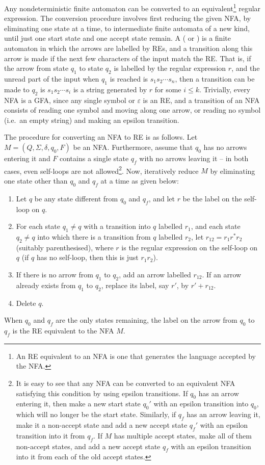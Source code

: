 Any nondeterministic finite automaton can be converted to an equivalent\footnote{An RE equivalent to an NFA is one that generates the language accepted by the NFA.} regular expression. The conversion procedure involves first reducing the given NFA, by eliminating one state at a time, to intermediate finite automata of a new kind, until just one start state and one accept state remain. A  ( or ) is a finite automaton in which the arrows are labelled by REs, and a transition along this arrow is made if the next few characters of the input match the RE. That is, if the arrow from state $q_1$ to state $q_2$ is labelled by the regular expression $r$, and the unread part of the input when $q_1$ is reached is $s_1 s_2 \cdots s_n$, then a transition can be made to $q_2$ is $s_1 s_2 \cdots s_i$ is a string generated by $r$ for some $i \le k$. Trivially, every NFA is a GFA, since any single symbol or $\varepsilon$ is an RE, and a transition of an NFA consists of reading one symbol and moving along one arrow, or reading no symbol (i.e.\ an empty string) and making an epsilon transition.

The procedure for converting an NFA to RE is as follows. Let $M = (Q, \Sigma, \delta, q_0, F)$ be an NFA. Furthermore, assume that $q_0$ has no arrows entering it and $F$ contains a single state $q_f$ with no arrows leaving it -- in both cases, even self-loops are not allowed\footnote{It is easy to see that any NFA can be converted to an equivalent NFA satisfying this condition by using epsilon transitions. If $q_0$ has an arrow entering it, then make a new start state $q_0'$ with an epsilon transition into $q_0$, which will no longer be the start state. Similarly, if $q_f$ has an arrow leaving it, make it a non-accept state and add a new accept state $q_f'$ with an epsilon transition into it from $q_f$. If $M$ has multiple accept states, make all of them non-accept states, and add a new accept state $q_f$ with an epsilon transition into it from each of the old accept states.}. Now, iteratively reduce $M$ by eliminating one state other than $q_0$ and $q_f$ at a time as given below:
\begin{enumerate}
\item Let $q$ be any state different from $q_0$ and $q_f$, and let $r$ be the label on the self-loop on $q$.
\item For each state $q_1 \ne q$ with a transition into $q$ labelled $r_1$, and each state $q_2 \ne q$ into which there is a transition from $q$ labelled $r_2$, let $r_{12} = r_1 r^* r_2$ (suitably parenthesised), where $r$ is the regular expression on the self-loop on $q$ (if $q$ has no self-loop, then this is just $r_1 r_2$).
\item If there is no arrow from $q_1$ to $q_2$, add an arrow labelled $r_{12}$. If an arrow already exists from $q_1$ to $q_2$, replace its label, say $r'$, by $r' + r_{12}$.
\item Delete $q$.
\end{enumerate}
When $q_0$ and $q_f$ are the only states remaining, the label on the arrow from $q_0$ to $q_f$ is the RE equivalent to the NFA $M$.

